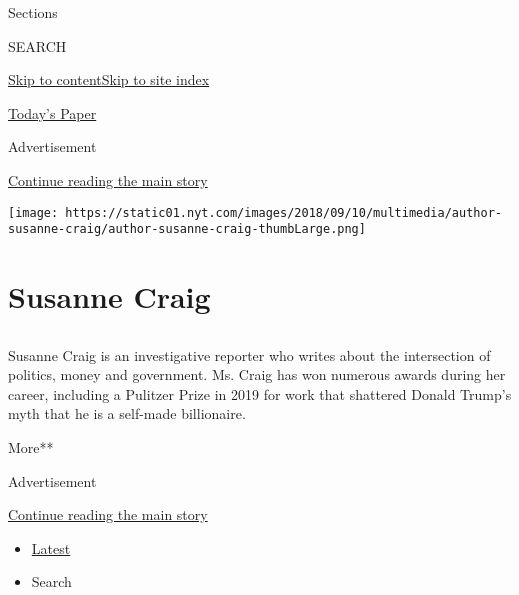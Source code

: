 Sections

SEARCH

\protect\hyperlink{site-content}{Skip to
content}\protect\hyperlink{site-index}{Skip to site index}

\href{https://myaccount.nytimes.com/auth/login?response_type=cookie\&client_id=vi}{}

\href{https://www.nytimes.com/section/todayspaper}{Today's Paper}

Advertisement

\protect\hyperlink{after-top}{Continue reading the main story}

\texttt{[image: https://static01.nyt.com/images/2018/09/10/multimedia/author-susanne-craig/author-susanne-craig-thumbLarge.png]}

\hypertarget{susanne-craig}{%
\section{Susanne Craig}\label{susanne-craig}}

\subsection{}

Susanne Craig is an investigative reporter who writes about the
intersection of politics, money and government. Ms. Craig has won
numerous awards during her career, including a Pulitzer Prize in 2019
for work that shattered Donald Trump's myth that he is a self-made
billionaire.

More**

Advertisement

\protect\hyperlink{after-mid1}{Continue reading the main story}

\begin{itemize}
\tightlist
\item
  \protect\hyperlink{stream-panel}{Latest}
\item
  Search
\end{itemize}

